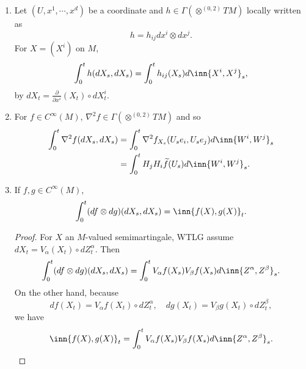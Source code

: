 \begin{exam}
    \begin{enumerate}[label=(\arabic*)]
        \item Let $(U,x^1,\cdots,x^d)$ be a coordinate and $h \in \Gamma(\otimes^{(0,2)}TM)$ locally written as
        \begin{equation*}
            h = h_{ij} dx^i \otimes dx^j.
        \end{equation*}
        For $X = (X^i)$ on $M$,
        \begin{equation*}
            \int_0^t h(dX_s,dX_s) = \int_0^t h_{ij}(X_s)d\inn{X^i,X^j}_s,
        \end{equation*}
        by $dX_t = \frac{\partial}{\partial x^i}(X_t) \circ dX^i_t$.

        \item For $f \in C^\infty(M)$, $\nabla^2 f \in \Gamma(\otimes^{(0,2)}TM)$ and so
        \begin{align*}
            \int_0^t \nabla^2 f(dX_s,dX_s) &= \int_0^t \nabla^2f_{X_s}(U_se_i,U_se_j)d\inn{W^i,W^j}_s \\
            &= \int_0^tH_jH_i\widetilde{f}(U_s)d\inn{W^i,W^j}_s.
        \end{align*}

        \item If $f,g \in C^\infty(M)$,
        \begin{equation*}
            \int_0^t(df \otimes dg)(dX_s,dX_s) = \inn{f(X),g(X)}_t.
        \end{equation*}
        \begin{proof}
            For $X$ an $M$-valued semimartingale, WTLG assume $dX_t = V_\alpha(X_t) \circ dZ^\alpha_t$. Then
            \begin{equation*}
                \int_0^t(df \otimes dg)(dX_s,dX_s) = \int_0^t V_\alpha f(X_s) V_\beta f(X_s) d\inn{Z^\alpha,Z^\beta}_s.
            \end{equation*}
            On the other hand, because
            \begin{equation*}
                df(X_t) = V_\alpha f(X_t) \circ dZ^\alpha_t,\quad dg(X_t) = V_\beta g(X_t) \circ dZ^\beta_t,
            \end{equation*}
            we have
            \begin{equation*}
                \inn{f(X),g(X)}_t = \int_0^tV_\alpha f(X_s) V_\beta f(X_s) d\inn{Z^\alpha,Z^\beta}_s. \qedhere
            \end{equation*}

        \end{proof}
    \end{enumerate}
\end{exam}

